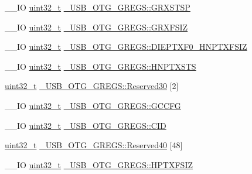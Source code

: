 \begin{DoxyCompactItemize}
\item 
\-\_\-\-\_\-\-I\-O \hyperlink{stdint_8h_a435d1572bf3f880d55459d9805097f62}{uint32\-\_\-t} \hyperlink{group___u_s_b___o_t_g___d_r_i_v_e_r_ga02cdc046ff409379b0323342a3181e3b}{\-\_\-\-U\-S\-B\-\_\-\-O\-T\-G\-\_\-\-G\-R\-E\-G\-S\-::\-G\-R\-X\-S\-T\-S\-P}
\item 
\-\_\-\-\_\-\-I\-O \hyperlink{stdint_8h_a435d1572bf3f880d55459d9805097f62}{uint32\-\_\-t} \hyperlink{group___u_s_b___o_t_g___d_r_i_v_e_r_gaec58fd028326b1f574abab5f95f6e34a}{\-\_\-\-U\-S\-B\-\_\-\-O\-T\-G\-\_\-\-G\-R\-E\-G\-S\-::\-G\-R\-X\-F\-S\-I\-Z}
\item 
\-\_\-\-\_\-\-I\-O \hyperlink{stdint_8h_a435d1572bf3f880d55459d9805097f62}{uint32\-\_\-t} \hyperlink{group___u_s_b___o_t_g___d_r_i_v_e_r_ga53e1edafd4aadb391e4583752a32d341}{\-\_\-\-U\-S\-B\-\_\-\-O\-T\-G\-\_\-\-G\-R\-E\-G\-S\-::\-D\-I\-E\-P\-T\-X\-F0\-\_\-\-H\-N\-P\-T\-X\-F\-S\-I\-Z}
\item 
\-\_\-\-\_\-\-I\-O \hyperlink{stdint_8h_a435d1572bf3f880d55459d9805097f62}{uint32\-\_\-t} \hyperlink{group___u_s_b___o_t_g___d_r_i_v_e_r_gac1bd7b9938b77197bb2c94599ba086d4}{\-\_\-\-U\-S\-B\-\_\-\-O\-T\-G\-\_\-\-G\-R\-E\-G\-S\-::\-H\-N\-P\-T\-X\-S\-T\-S}
\item 
\hyperlink{stdint_8h_a435d1572bf3f880d55459d9805097f62}{uint32\-\_\-t} \hyperlink{group___u_s_b___o_t_g___d_r_i_v_e_r_ga30233663b98834cfbc214a65f8b94339}{\-\_\-\-U\-S\-B\-\_\-\-O\-T\-G\-\_\-\-G\-R\-E\-G\-S\-::\-Reserved30} \mbox{[}2\mbox{]}
\item 
\-\_\-\-\_\-\-I\-O \hyperlink{stdint_8h_a435d1572bf3f880d55459d9805097f62}{uint32\-\_\-t} \hyperlink{group___u_s_b___o_t_g___d_r_i_v_e_r_ga6e3bfdd9ce2d01c8332866407e9e7d4e}{\-\_\-\-U\-S\-B\-\_\-\-O\-T\-G\-\_\-\-G\-R\-E\-G\-S\-::\-G\-C\-C\-F\-G}
\item 
\-\_\-\-\_\-\-I\-O \hyperlink{stdint_8h_a435d1572bf3f880d55459d9805097f62}{uint32\-\_\-t} \hyperlink{group___u_s_b___o_t_g___d_r_i_v_e_r_ga19d68aae52d7d55565b2acb97f74d366}{\-\_\-\-U\-S\-B\-\_\-\-O\-T\-G\-\_\-\-G\-R\-E\-G\-S\-::\-C\-I\-D}
\item 
\hyperlink{stdint_8h_a435d1572bf3f880d55459d9805097f62}{uint32\-\_\-t} \hyperlink{group___u_s_b___o_t_g___d_r_i_v_e_r_gad08bd7ddde680e062b2a9f274beadd6e}{\-\_\-\-U\-S\-B\-\_\-\-O\-T\-G\-\_\-\-G\-R\-E\-G\-S\-::\-Reserved40} \mbox{[}48\mbox{]}
\item 
\-\_\-\-\_\-\-I\-O \hyperlink{stdint_8h_a435d1572bf3f880d55459d9805097f62}{uint32\-\_\-t} \hyperlink{group___u_s_b___o_t_g___d_r_i_v_e_r_ga301da71393e190cdc4f3cb3c07c80d33}{\-\_\-\-U\-S\-B\-\_\-\-O\-T\-G\-\_\-\-G\-R\-E\-G\-S\-::\-H\-P\-T\-X\-F\-S\-I\-Z}

\end{DoxyCompactItemize}
